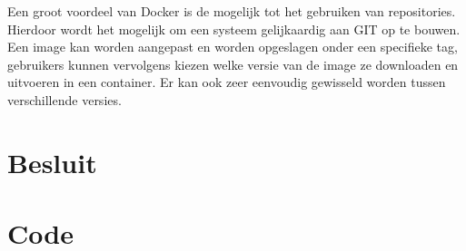 \documentclass{article}
\begin{document}
Een groot voordeel van Docker is de mogelijk tot het gebruiken van repositories.
Hierdoor wordt het mogelijk om een systeem gelijkaardig aan GIT op te bouwen.
Een image kan worden aangepast en worden opgeslagen onder een specifieke tag, gebruikers kunnen vervolgens kiezen welke versie van de image ze downloaden en uitvoeren in een container.
Er kan ook zeer eenvoudig gewisseld worden tussen verschillende versies.

\section{Besluit}


\section{Code}



%

\end{document}

